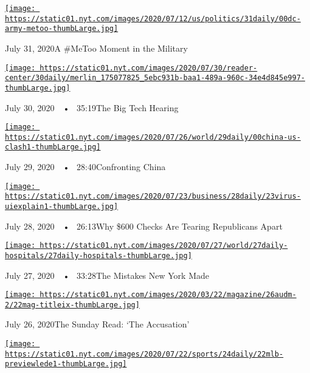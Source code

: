 \href{https://www.nytimes.com/2020/07/31/podcasts/the-daily/vanessa-guillen-military-metoo.html?action=click\&module=audio-series-bar\&region=header\&pgtype=Article}{\texttt{[image: https://static01.nyt.com/images/2020/07/12/us/politics/31daily/00dc-army-metoo-thumbLarge.jpg]}}

July 31, 2020A \#MeToo Moment in the Military

\href{https://www.nytimes.com/2020/07/30/podcasts/the-daily/congress-facebook-amazon-google-apple.html?action=click\&module=audio-series-bar\&region=header\&pgtype=Article}{\texttt{[image: https://static01.nyt.com/images/2020/07/30/reader-center/30daily/merlin\_175077825\_5ebc931b-baa1-489a-960c-34e4d845e997-thumbLarge.jpg]}}

July 30, 2020~~•~ 35:19The Big Tech Hearing

\href{https://www.nytimes.com/2020/07/29/podcasts/the-daily/china-trump-foreign-policy.html?action=click\&module=audio-series-bar\&region=header\&pgtype=Article}{\texttt{[image: https://static01.nyt.com/images/2020/07/26/world/29daily/00china-us-clash1-thumbLarge.jpg]}}

July 29, 2020~~•~ 28:40Confronting China

\href{https://www.nytimes.com/2020/07/28/podcasts/the-daily/unemployment-benefits-coronavirus.html?action=click\&module=audio-series-bar\&region=header\&pgtype=Article}{\texttt{[image: https://static01.nyt.com/images/2020/07/23/business/28daily/23virus-uiexplain1-thumbLarge.jpg]}}

July 28, 2020~~•~ 26:13Why \$600 Checks Are Tearing Republicans Apart

\href{https://www.nytimes.com/2020/07/27/podcasts/the-daily/new-york-hospitals-covid.html?action=click\&module=audio-series-bar\&region=header\&pgtype=Article}{\texttt{[image: https://static01.nyt.com/images/2020/07/27/world/27daily-hospitals/27daily-hospitals-thumbLarge.jpg]}}

July 27, 2020~~•~ 33:28The Mistakes New York Made

\href{https://www.nytimes.com/2020/07/26/podcasts/the-daily/the-accusation-the-sunday-read.html?action=click\&module=audio-series-bar\&region=header\&pgtype=Article}{\texttt{[image: https://static01.nyt.com/images/2020/03/22/magazine/26audm-2/22mag-titleix-thumbLarge.jpg]}}

July 26, 2020The Sunday Read: `The Accusation'

\href{https://www.nytimes.com/2020/07/24/podcasts/the-daily/mlb-baseball-season-coronavirus.html?action=click\&module=audio-series-bar\&region=header\&pgtype=Article}{\texttt{[image: https://static01.nyt.com/images/2020/07/22/sports/24daily/22mlb-previewlede1-thumbLarge.jpg]}}


